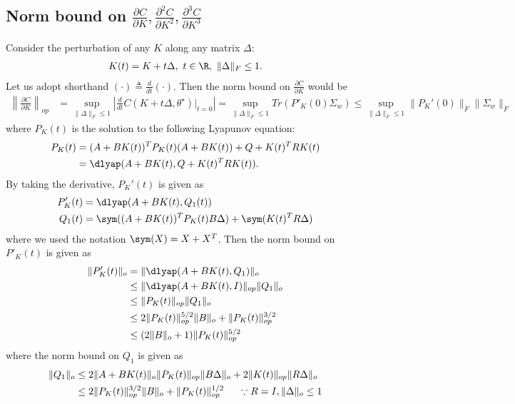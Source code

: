 \subsection{Norm bound on $\frac{\partial C}{\partial K}, \frac{\partial^2 C}{\partial K^2}, \frac{\partial^3 C}{\partial K^3}$}
Consider the perturbation of any $K$ along any matrix $\Delta$:
\begin{align}
    K(t) = K + t\Delta, ~ t \in \R \label{eq:K(t)}, ~ \|\Delta\|_F\leq1.
\end{align}
Let us adopt shorthand $(\cdot) \triangleq \frac{d}{dt}(\cdot)$. Then the norm bound on $\frac{\partial C}{\partial K}$ would be
\begin{align*}
    \left\|\frac{\partial C}{\partial K}\right\|_{op} &= \sup_{\|\Delta\|_F\leq1}\left|\frac{d}{dt}C(K+t\Delta, \theta^\star)|_{t=0}\right| = \sup_{\|\Delta\|_F\leq1} Tr(P'_K(0)\Sigma_w) \leq \sup_{\|\Delta\|_F\leq1}\|P_K'(0)\|_F\|\Sigma_w\|_F
\end{align*}
where $P_K(t)$ is the solution to the following Lyapunov equation:
\begin{align*}
    P_K(t) &= (A + BK(t))^TP_K(t)(A + BK(t)) + Q + K(t)^TRK(t) \\
    &= \dlyap(A+BK(t), Q + K(t)^TRK(t)).
\end{align*}
By taking the derivative, $P_K'(t)$ is given as 
\begin{align*}
    P_K'(t) &= \dlyap(A+BK(t), Q_1(t)) \\
    Q_1(t) &= \sym((A+BK(t))^TP_K(t)B\Delta) + \sym(K(t)^TR\Delta)
\end{align*}
where we used the notation $\sym(X) = X + X^T$. 
Then the norm bound on $P'_K(t)$ is given as
\begin{align}
    \|P_K'(t)\|_o &= \|\dlyap(A + BK(t), Q_1)\|_o \nonumber\\
    &\leq \|\dlyap(A+BK(t),I)\|_{op}\|Q_1\|_{o} \nonumber\\
    &\leq \|P_K(t)\|_{op}\|Q_1\|_o \nonumber\\
    &\leq 2\|P_K(t)\|^{5/2}_{op}\|B\|_o + \|P_K(t)\|^{3/2}_{op} \nonumber \\
    &\leq (2\|B\|_o+1)\|P_K(t)\|^{5/2}_{op}    \label{eq:Pk' bound} 
\end{align}
where the norm bound on $Q_1$ is given as 
\begin{align*}
    \|Q_1\|_{o} &\leq 2\|A+BK(t)\|_{o}\|P_K(t)\|_{op}\|B\Delta\|_{o} + 2\|K(t)\|_{op}\|R\Delta\|_o \\
    &\leq 2\|P_K(t)\|^{3/2}_{op}\|B\|_o + \|P_K(t)\|^{1/2}_{op} \hspace{5mm} \because R = I, \|\Delta\|_o\leq1
\end{align*}
